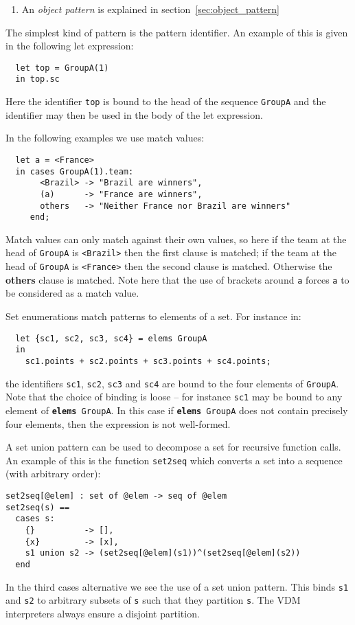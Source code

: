 \documentclass{overturerepchap}
\newcommand{\keyw}[1]{{\bf\ttfamily #1}}
\begin{document}
{\begin{description}
\begin{enumerate}
  \item An {\it object pattern} is explained in section~\ref{sec:object_pattern}
  \end{enumerate}

\item[Examples:] The simplest kind of pattern is the pattern
identifier. An example of this is given in the following let
expression:
\begin{lstlisting}
  let top = GroupA(1)
  in top.sc
\end{lstlisting}
Here the identifier \texttt{top} is bound to the head of the sequence
\texttt{GroupA} and the identifier may then be used in the body of the
let expression.

In the following examples we use match values:
\begin{lstlisting}
  let a = <France>
  in cases GroupA(1).team:
       <Brazil> -> "Brazil are winners",
       (a)      -> "France are winners",
       others   -> "Neither France nor Brazil are winners"
     end;
\end{lstlisting}
Match values can only match against their own values, so here if the
team at the head of \texttt{GroupA} is \texttt{<Brazil>} then the
first clause is matched; if the team at the head of \texttt{GroupA} is
\texttt{<France>} then the second clause is matched. Otherwise the
\keyw{others} clause is matched. Note here that the use of brackets
around \texttt{a} forces \texttt{a} to be considered as a match value.

Set enumerations match patterns to elements of a set. For instance in:
\begin{lstlisting}
  let {sc1, sc2, sc3, sc4} = elems GroupA
  in
    sc1.points + sc2.points + sc3.points + sc4.points;
\end{lstlisting}
the identifiers \texttt{sc1}, \texttt{sc2}, \texttt{sc3} and
\texttt{sc4} are bound to the four elements of \texttt{GroupA}. Note
that the choice of binding is loose -- for instance
\texttt{sc1} may be bound to any element of \texttt{\keyw{elems}
GroupA}. In this case if \texttt{\keyw{elems} GroupA} does not contain
precisely four elements, then the expression is not well-formed.

A set union pattern can be used to decompose a set for recursive
function calls. An example of this is the function \texttt{set2seq}
which converts a set into a sequence (with arbitrary order):
\begin{lstlisting}
set2seq[@elem] : set of @elem -> seq of @elem
set2seq(s) ==
  cases s:
    {}          -> [],
    {x}         -> [x],
    s1 union s2 -> (set2seq[@elem](s1))^(set2seq[@elem](s2))
  end
\end{lstlisting}
In the third cases alternative we see the use of a set union pattern. This
binds \texttt{s1} and \texttt{s2} to arbitrary subsets of \texttt{s}
such that they partition \texttt{s}. The VDM interpreters always
ensure a disjoint partition.


\end{description}}
\end{document}
